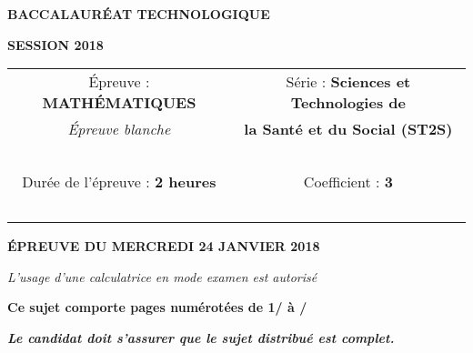 \begin{center}
	
	{\scshape\LARGE \textbf{BACCALAUR\'EAT TECHNOLOGIQUE} \par}
	\vspace{1cm}
	{\scshape\Large \textbf{SESSION 2018}\par}
	\vspace{1.5cm}
	

	\begin{large}
		\begin{tabular}{|@{\ }c@{\ }|@{\ }c@{\ }|}
		\hline
		\'Epreuve : \textbf{MATH\'EMATIQUES} & Série : \textbf{Sciences et Technologies de}  \\ 
		\textit{\'Epreuve blanche}&  \textbf{la Santé et du Social (ST2S)} \\ \hline
		\ & \ \\
		Durée de l'épreuve : \textbf{2 heures} & Coefficient : \textbf{3} \\ 
		\ & \ \\
		\hline
	\end{tabular}
	\end{large}
		
	\vspace{1cm}
	{\large\bfseries \'EPREUVE DU MERCREDI 24 JANVIER 2018}
	
	\vspace{1cm}
	{\itshape L'usage d'une calculatrice en mode examen est autorisé\par}
	\vspace{1.5cm}
	{\bfseries Ce sujet comporte \pageref{LastPage} pages numérotées de 1/\pageref{LastPage} à \pageref{LastPage}/\pageref{LastPage} }
	
	
	\vspace{0.5cm}
	{\bfseries\itshape Le candidat doit s'assurer que le sujet distribué est complet. }
	
	\vfill	
	
	
	\vfill

\end{center}
\newpage